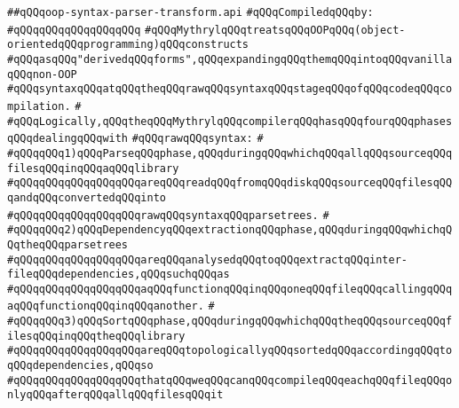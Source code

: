 \label{src/lib/compiler/front/parser/raw-syntax/oop-syntax-parser-transform.api}
\verb|##qQQqoop-syntax-parser-transform.api|\newline
\newline
\verb|#qQQqCompiledqQQqby:|\newline
\verb|#qQQqqQQqqQQqqQQqqQQq|\newline
\newline
\verb|#qQQqMythrylqQQqtreatsqQQqOOPqQQq(object-orientedqQQqprogramming)qQQqconstructs|\newline
\verb|#qQQqasqQQq"derivedqQQqforms",qQQqexpandingqQQqthemqQQqintoqQQqvanillaqQQqnon-OOP|\newline
\verb|#qQQqsyntaxqQQqatqQQqtheqQQqrawqQQqsyntaxqQQqstageqQQqofqQQqcodeqQQqcompilation.|\newline
\verb|#|\newline
\verb|#qQQqLogically,qQQqtheqQQqMythrylqQQqcompilerqQQqhasqQQqfourqQQqphasesqQQqdealingqQQqwith|\newline
\verb|#qQQqrawqQQqsyntax:|\newline
\verb|#|\newline
\verb|#qQQqqQQq1)qQQqParseqQQqphase,qQQqduringqQQqwhichqQQqallqQQqsourceqQQqfilesqQQqinqQQqaqQQqlibrary|\newline
\verb|#qQQqqQQqqQQqqQQqqQQqareqQQqreadqQQqfromqQQqdiskqQQqsourceqQQqfilesqQQqandqQQqconvertedqQQqinto|\newline
\verb|#qQQqqQQqqQQqqQQqqQQqrawqQQqsyntaxqQQqparsetrees.|\newline
\verb|#|\newline
\verb|#qQQqqQQq2)qQQqDependencyqQQqextractionqQQqphase,qQQqduringqQQqwhichqQQqtheqQQqparsetrees|\newline
\verb|#qQQqqQQqqQQqqQQqqQQqareqQQqanalysedqQQqtoqQQqextractqQQqinter-fileqQQqdependencies,qQQqsuchqQQqas|\newline
\verb|#qQQqqQQqqQQqqQQqqQQqaqQQqfunctionqQQqinqQQqoneqQQqfileqQQqcallingqQQqaqQQqfunctionqQQqinqQQqanother.|\newline
\verb|#|\newline
\verb|#qQQqqQQq3)qQQqSortqQQqphase,qQQqduringqQQqwhichqQQqtheqQQqsourceqQQqfilesqQQqinqQQqtheqQQqlibrary|\newline
\verb|#qQQqqQQqqQQqqQQqqQQqareqQQqtopologicallyqQQqsortedqQQqaccordingqQQqtoqQQqdependencies,qQQqso|\newline
\verb|#qQQqqQQqqQQqqQQqqQQqthatqQQqweqQQqcanqQQqcompileqQQqeachqQQqfileqQQqonlyqQQqafterqQQqallqQQqfilesqQQqit|\newline
